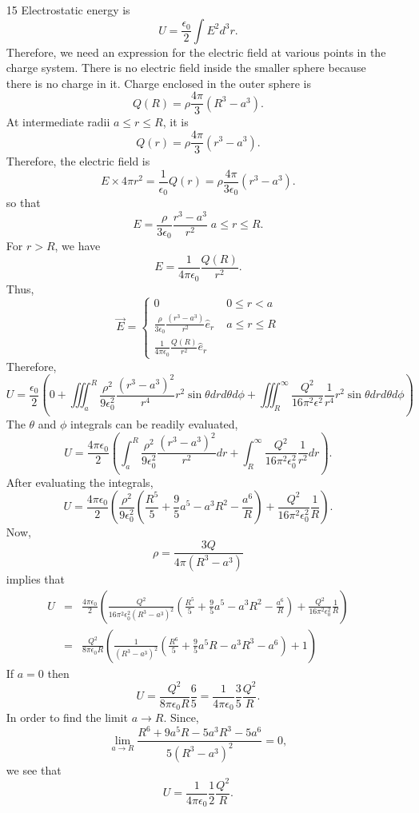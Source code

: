 \documentclass{article}
\newcommand{\uv}[1]{\hat{e}_{#1}}
\newcommand{\ke}{\frac{1}{4\pi\epsilon_0}}
\begin{document}
\begin{enumerate}
\item[15] Electrostatic energy is
\[
U = \frac{\epsilon_0}{2}\int E^2 d^3r.
\]
Therefore, we need an expression for the electric field at various points in the
charge system. There is no electric field inside the smaller sphere because there
is no charge in it. Charge enclosed in the outer sphere is
\[
Q(R) = \rho \frac{4\pi}{3} (R^3 - a^3).
\]
At intermediate radii $a \le r \le R$, it is
\[
Q(r) = \rho \frac{4\pi}{3} (r^3 - a^3).
\]
Therefore, the electric field is
\[
E \times 4\pi r^2 = \frac{1}{\epsilon_0}Q(r) = \rho \frac{4\pi}{3\epsilon_0} (r^3 - a^3).
\]
so that
\[
E = \frac{\rho}{3\epsilon_0}\frac{r^3 - a^3}{r^2} \; a \le r \le R.
\]
For $r > R$, we have
\[
E = \ke\frac{Q(R)}{r^2}.
\]
Thus,
\[
\vec{E} = \begin{cases} 0 & \; 0 \le r < a \\
 \frac{\rho}{3\epsilon_0} \frac{(r^3 - a^3)}{r^2} \uv{r} & \; a \le r \le R \\
\ke\frac{Q(R)}{r^2} \uv{r} 
\end{cases}
\]
Therefore,
\[
U = \frac{\epsilon_0}{2}\left(0 + 
\iiint_a^R \frac{\rho^2}{9\epsilon_0^2}\frac{(r^3-a^3)^2}{r^4}r^2\sin\theta drd\theta d\phi +
\iiint_R^\infty \frac{Q^2}{16\pi^2\epsilon^2}\frac{1}{r^4}r^2\sin\theta drd\theta d\phi\right)
\]
The $\theta$ and $\phi$ integrals can be readily evaluated,
\[
U = \frac{4\pi\epsilon_0}{2}\left(
\int_a^R \frac{\rho^2}{9\epsilon_0^2}\frac{(r^3-a^3)^2}{r^2} dr +
\int_R^\infty \frac{Q^2}{16\pi^2\epsilon_0^2}\frac{1}{r^2} dr\right).
\]
After evaluating the integrals,
\[
U = \frac{4\pi\epsilon_0}{2}\left(\frac{\rho^2}{9\epsilon_0^2}\left(
\frac{R^5}{5} + \frac{9}{5}a^5 - a^3R^2 - \frac{a^6}{R}\right) + 
\frac{Q^2}{16\pi^2\epsilon_0^2}\frac{1}{R}\right).
\]
Now,
\[
\rho = \frac{3Q}{4\pi(R^3 - a^3)}
\]
implies that
\begin{eqnarray*}
U &=& \frac{4\pi\epsilon_0}{2}\left(\frac{Q^2}{16\pi^2\epsilon_0^2(R^3 - a^3)^2}\left(
\frac{R^5}{5} + \frac{9}{5}a^5 - a^3R^2 - \frac{a^6}{R}\right) + 
\frac{Q^2}{16\pi^2\epsilon_0^2}\frac{1}{R}\right) \\
 &=&  \frac{Q^2}{8\pi\epsilon_0R}\left(\frac{1}{(R^3 - a^3)^2}\left(
\frac{R^6}{5} + \frac{9}{5}a^5R - a^3R^3 - a^6\right) + 1\right) 
\end{eqnarray*}
If $a = 0$ then
\[
U = \frac{Q^2}{8\pi\epsilon_0R}\frac{6}{5} = \ke\frac{3}{5}\frac{Q^2}{R}.
\]
In order to find the limit $a \rightarrow R$. Since,
\[
\lim_{a \rightarrow R}\frac{R^6 + 9a^5R - 5a^3R^3 - 5a^6}{5(R^3 - a^3)^2} = 0,
\]
we see that
\[
U = \ke\frac{1}{2}\frac{Q^2}{R}.
\] 


\end{enumerate}
\end{document}
